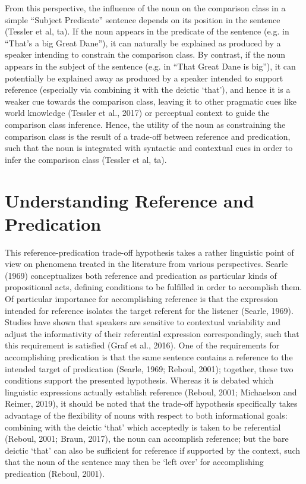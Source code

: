 From this perspective, the influence of the noun on the comparison class in a simple “Subject Predicate” sentence depends on its position in the sentence (Tessler et al, ta). If the noun appears in the predicate of the sentence (e.g. in “That’s a big Great Dane”), it can naturally be explained as produced by a speaker intending to constrain the comparison class. By contrast, if the noun appears in the subject of the sentence (e.g. in “That Great Dane is big”), it can potentially be explained away as produced by a speaker intended to support reference (especially via combining it with the deictic ‘that’), and hence it is a weaker cue towards the comparison class, leaving it to other pragmatic cues like world knowledge (Tessler et al., 2017) or perceptual context to guide the comparison class inference. 
Hence, the utility of the noun as constraining the comparison class is the result of a trade-off between reference and predication, such that the noun is integrated with syntactic and contextual cues in order to infer the comparison class (Tessler et al, ta).

\section{Understanding Reference and Predication}
This reference-predication trade-off hypothesis takes a rather linguistic point of view on phenomena treated in the literature from various perspectives. 
Searle (1969) conceptualizes both reference and predication as particular kinds of propositional acts, defining conditions to be fulfilled in order to accomplish them. Of particular importance for accomplishing reference is that the expression intended for reference isolates the target referent for the listener (Searle, 1969). Studies have shown that speakers are sensitive to contextual variability and adjust the informativity of their referential expression correspondingly, such that this requirement is satisfied (Graf et al., 2016). One of the requirements for accomplishing predication is that the same sentence contains a reference to the intended target of predication (Searle, 1969; Reboul, 2001); together, these two conditions support the presented hypothesis. 
Whereas it is debated which linguistic expressions actually establish reference (Reboul, 2001; Michaelson and Reimer, 2019), it should be noted that the trade-off hypothesis specifically takes advantage of the flexibility of nouns with respect to both informational goals: combining with the deictic ‘that’ which acceptedly is taken to be referential (Reboul, 2001; Braun, 2017), the noun can accomplish reference; but the bare deictic ‘that’ can also be sufficient for reference if supported by the context, such that the noun of the sentence may then be ‘left over’ for accomplishing predication (Reboul, 2001). 


